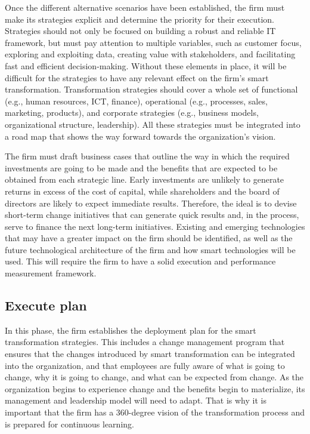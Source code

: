 \documentclass[
  letterpaper,
  DIV=11,
  numbers=noendperiod]{scrreprt}
\begin{document}
Once the different alternative scenarios have been established, the firm
must make its strategies explicit and determine the priority for their
execution. Strategies should not only be focused on building a robust
and reliable IT framework, but must pay attention to multiple variables,
such as customer focus, exploring and exploiting data, creating value
with stakeholders, and facilitating fast and efficient decision-making.
Without these elements in place, it will be difficult for the strategies
to have any relevant effect on the firm's smart transformation.
Transformation strategies should cover a whole set of functional (e.g.,
human resources, ICT, finance), operational (e.g., processes, sales,
marketing, products), and corporate strategies (e.g., business models,
organizational structure, leadership). All these strategies must be
integrated into a road map that shows the way forward towards the
organization's vision.

The firm must draft business cases that outline the way in which the
required investments are going to be made and the benefits that are
expected to be obtained from each strategic line. Early investments are
unlikely to generate returns in excess of the cost of capital, while
shareholders and the board of directors are likely to expect immediate
results. Therefore, the ideal is to devise short-term change initiatives
that can generate quick results and, in the process, serve to finance
the next long-term initiatives. Existing and emerging technologies that
may have a greater impact on the firm should be identified, as well as
the future technological architecture of the firm and how smart
technologies will be used. This will require the firm to have a solid
execution and performance measurement framework.

\hypertarget{execute-plan}{%
\subsection{Execute plan}\label{execute-plan}}

In this phase, the firm establishes the deployment plan for the smart
transformation strategies. This includes a change management program
that ensures that the changes introduced by smart transformation can be
integrated into the organization, and that employees are fully aware of
what is going to change, why it is going to change, and what can be
expected from change. As the organization begins to experience change
and the benefits begin to materialize, its management and leadership
model will need to adapt. That is why it is important that the firm has
a 360-degree vision of the transformation process and is prepared for
continuous learning.
\end{document}
